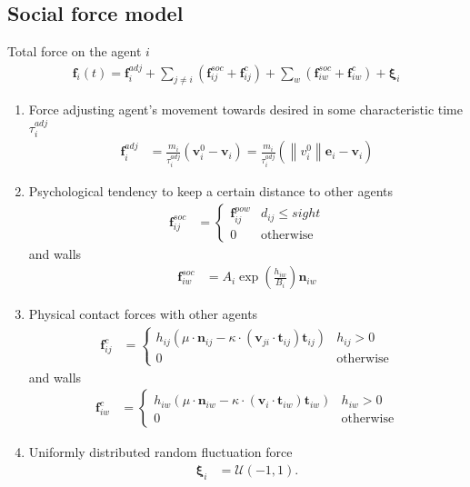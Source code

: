 \subsection{Social force model}
Total force on the agent $ i $
\begin{align}
\mathbf{f}_{i}(t) = \mathbf{f}_{i}^{adj} + \sum_{j\neq i}^{} \left(\mathbf{f}_{ij}^{soc} + \mathbf{f}_{ij}^{c}\right) + \sum_{w}^{} \left(\mathbf{f}_{iw}^{soc} + \mathbf{f}_{iw}^{c}\right) + \boldsymbol{\xi}_{i}
\end{align}

\begin{enumerate}[label=\roman{enumi})]
\item 
Force adjusting agent's movement towards desired in some characteristic time $ \tau_{i}^{adj} $
\begin{align}
\mathbf{f}_{i}^{adj} &= \frac{m_{i}}{\tau_{i}^{adj}} (\mathbf{v}_{i}^{0} - \mathbf{v}_{i}) = \frac{m_{i}}{\tau_{i}^{adj}} (\left\|v_{i}^{0}\right\| \mathbf{e}_{i} - \mathbf{v}_{i})
\end{align}


\item 
Psychological tendency to keep a certain distance to other agents
\begin{align}
\mathbf{f}_{ij}^{soc} &=
\begin{cases}
\mathbf{f}_{ij}^{pow} &  d_{ij} \leq sight \\
0 & \text{otherwise}
\end{cases}
\end{align}
and walls
\begin{align}
\mathbf{f}_{iw}^{soc} &= A_{i} \exp\left(\frac{h_{iw}}{B_{i}}\right) \mathbf{n}_{iw}
\end{align} 


\item 
Physical contact forces with other agents 
\begin{align}
\mathbf{f}_{ij}^{c} &= 
\begin{cases}
h_{ij} \left(\mu \cdot \mathbf{n}_{ij} - \kappa \cdot \left(\mathbf{v}_{ji} \cdot \mathbf{t}_{ij}\right) \mathbf{t}_{ij}\right) & h_{ij} > 0 \\
0 & \text{otherwise}
\end{cases}
\end{align}
and walls
\begin{align}
\mathbf{f}_{iw}^{c} &= 
\begin{cases}
h_{iw} \left(\mu \cdot \mathbf{n}_{iw} - \kappa \cdot (\mathbf{v}_{i} \cdot \mathbf{t}_{iw}) \mathbf{t}_{iw}\right) & h_{iw} > 0 \\
0 & \text{otherwise}
\end{cases}
\end{align}


\item 
Uniformly distributed random fluctuation force
\begin{align}
\boldsymbol{\xi}_{i} &= \boldsymbol{\mathcal{U}}(-1, 1).
\end{align}


\end{enumerate}


